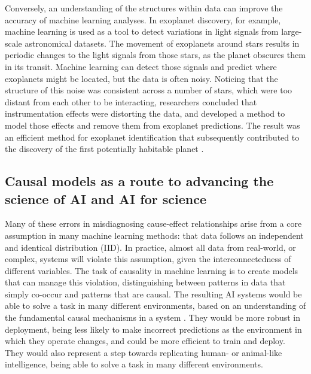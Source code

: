 Conversely, an understanding of the structures within data can improve
the accuracy of machine learning analyses. In exoplanet discovery, for
example, machine learning is used as a tool to detect variations in
light signals from large-scale astronomical datasets. The movement of
exoplanets around stars results in periodic changes to the light signals
from those stars, as the planet obscures them in its transit. Machine
learning can detect those signals and predict where exoplanets might be
located, but the data is often noisy. Noticing that the structure of
this noise was consistent across a number of stars, which were too
distant from each other to be interacting, researchers concluded that
instrumentation effects were distorting the data, and developed a method
to model those effects and remove them from exoplanet predictions. The
result was an efficient method for exoplanet identification that
subsequently contributed to the discovery of the first potentially
habitable planet \citep{Scholkopf-causality22}.

\subsection{Causal models as a route to advancing the science of AI and
AI for
science}\label{causal-models-as-a-route-to-advancing-the-science-of-ai-and-ai-for-science}

Many of these errors in misdiagnosing cause-effect relationships arise
from a core assumption in many machine learning methods: that data
follows an independent and identical distribution (IID). In practice,
almost all data from real-world, or complex, systems will violate this
assumption, given the interconnectedness of different variables. The
task of causality in machine learning is to create models that can
manage this violation, distinguishing between patterns in data that
simply co-occur and patterns that are causal. The resulting AI systems
would be able to solve a task in many different environments, based on
an understanding of the fundamental causal mechanisms in a
system \citep{Peters-elements17}. They would be more robust in
deployment, being less likely to make incorrect predictions as the
environment in which they operate changes, and could be more efficient
to train and deploy. They would also represent a step towards
replicating human- or animal-like intelligence, being able to solve a
task in many different environments.

